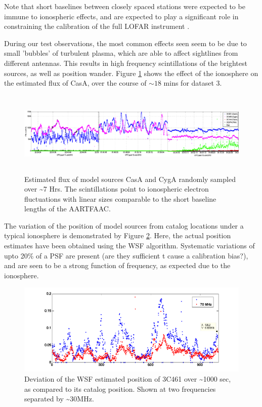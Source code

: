 \documentclass{aa}
\begin{document}
Note that  short baselines between closely  spaced stations were  expected to be
immune to  ionospheric effects, and are  expected to play a  significant role in
constraining    the     calibration    of    the     full    LOFAR    instrument
\citep{vdTol2007selfcallofar}.

During our  test observations, the  most common effects  seen seem to be  due to
small 'bubbles'  of turbulent plasma, which  are able to  affect sightlines from
different  antennas.  This  results  in  high frequency  scintillations  of  the
brightest     sources,     as    well     as     position    wander.      Figure
\ref{fig:Estimated-flux-of} shows the effect  of the ionosphere on the estimated
flux of CasA, over the course of $\sim18$ mins for dataset 3.

\begin{figure}[tbh]
\includegraphics[width=1\textwidth,height=4cm]{Figs/combined_plot_utc_tstamp}

\caption{\label{fig:Estimated-flux-of}Estimated flux  of model sources  CasA and
  CygA randomly sampled over \textasciitilde{}7 Hrs. The scintillations point to
  ionospheric electron  fluctuations with linear  sizes comparable to  the short
  baseline lengths of the AARTFAAC.}
\end{figure}


The variation  of the position of  model sources from catalog  locations under a
typical ionosphere is  demonstrated by Figure \ref{fig:Deviation-of-the}.  Here,
the   actual   position   estimates   have   been   obtained   using   the   WSF
algorithm. Systematic  variations of upto  20\% of a  PSF are present  (are they
sufficient t cause a calibration bias?), and are seen to be a strong function of
frequency, as expected due to the ionosphere.

\begin{figure}[tbh]
\includegraphics[width=1.1\columnwidth]{Figs/nighttime_SB0_wsf_deviation_to_SB4_try}

\caption{\label{fig:Deviation-of-the}Deviation of the WSF estimated position
of 3C461 over \textasciitilde{}1000 sec, as compared to its catalog
position. Shown at two frequencies separated by \textasciitilde{}30MHz.}
\end{figure}
\end{document}
